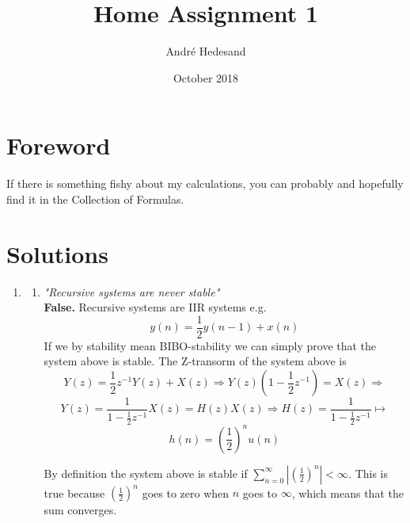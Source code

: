 \documentclass{article}
\title{Home Assignment 1}
\author{André Hedesand}
\date{October 2018}
\begin{document}
\maketitle
\section*{Foreword}
If there is something fishy about my calculations, you can probably and hopefully
find it in the Collection of Formulas.

\section*{Solutions}

\begin{enumerate}
    \item %
        \begin{enumerate}
            \item %
                \emph{"Recursive systems are never stable"}
                \\
                \textbf{False.} 
                Recursive systems are IIR systems e.g. 
                $$ y(n) = \frac{1}{2}y(n-1) + x(n) $$
                If we by stability mean BIBO-stability we can simply prove that the system above is stable. The Z-transorm of the system above is
                $$ 
                    Y(z) = \frac{1}{2}z^{-1}Y(z) + X(z) \Rightarrow
                    Y(z)(1 - \frac{1}{2}z^{-1}) = X(z) \Rightarrow
                $$
                $$
                    Y(z) = \frac{1}{1 - \frac{1}{2}z^{-1}}X(z) = 
                    H(z) X(z) \Rightarrow 
                    H(z) = \frac{1}{1 - \frac{1}{2}z^{-1}} \longmapsto
                $$
                $$
                    h(n) = (\frac{1}{2})^{n} u(n)
                $$
                
                By definition the system above is stable if
                $ \sum_{n=0}^{\infty} |(\frac{1}{2})^{n}| < \infty $.
                This is true because $(\frac{1}{2})^{n}$ goes to zero when $n$
goes to $\infty$, which means that the sum converges.
            

\end{enumerate}
\end{enumerate}
\end{document}
